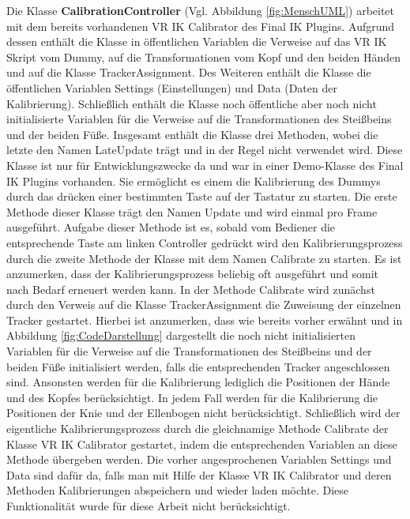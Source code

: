 \newline\newline
Die Klasse \textbf{CalibrationController} (Vgl. Abbildung \ref{fig:MenschUML}) arbeitet mit dem bereits vorhandenen VR IK Calibrator des Final IK Plugins. Aufgrund dessen enthält die Klasse in öffentlichen Variablen die Verweise auf das VR IK Skript vom Dummy, auf die Transformationen vom Kopf und den beiden Händen und auf die Klasse TrackerAssignment. Des Weiteren enthält die Klasse die öffentlichen Variablen Settings (Einstellungen) und Data (Daten der Kalibrierung). Schließlich enthält die Klasse noch öffentliche aber noch nicht initialisierte Variablen für die Verweise auf die Transformationen des Steißbeins und der beiden Füße.
\newline
Insgesamt enthält die Klasse drei Methoden, wobei die letzte den Namen LateUpdate trägt und in der Regel nicht verwendet wird. Diese Klasse ist nur für Entwicklungszwecke da und war in einer Demo-Klasse des Final IK Plugins vorhanden. Sie ermöglicht es einem die Kalibrierung des Dummys durch das drücken einer bestimmten Taste auf der Tastatur zu starten. Die erste Methode dieser Klasse trägt den Namen Update und wird einmal pro Frame ausgeführt. Aufgabe dieser Methode ist es, sobald vom Bediener die entsprechende Taste am linken Controller gedrückt wird den Kalibrierungsprozess durch die zweite Methode der Klasse mit dem Namen Calibrate zu starten. Es ist anzumerken, dass der Kalibrierungsprozess beliebig oft ausgeführt und somit nach Bedarf erneuert werden kann.
\newline
In der Methode Calibrate wird zunächst durch den Verweis auf die Klasse TrackerAssignment die Zuweisung der einzelnen Tracker gestartet. Hierbei ist anzumerken, dass wie bereits vorher erwähnt und in Abbildung \ref{fig:CodeDarstellung} dargestellt die noch nicht initialisierten Variablen für die Verweise auf die Transformationen des Steißbeins und der beiden Füße initialisiert werden, falls die entsprechenden Tracker angeschlossen sind. Ansonsten werden für die Kalibrierung lediglich die Positionen der Hände und des Kopfes berücksichtigt. In jedem Fall werden für die Kalibrierung die Positionen der Knie und der Ellenbogen nicht berücksichtigt.
\newline
Schließlich wird der eigentliche Kalibrierungsprozess durch die gleichnamige Methode Calibrate der Klasse VR IK Calibrator gestartet, indem die entsprechenden Variablen an diese Methode übergeben werden. Die vorher angesprochenen Variablen Settings und Data sind dafür da, falls man mit Hilfe der Klasse VR IK Calibrator und deren Methoden Kalibrierungen abspeichern und wieder laden möchte. Diese Funktionalität wurde für diese Arbeit nicht berücksichtigt.
